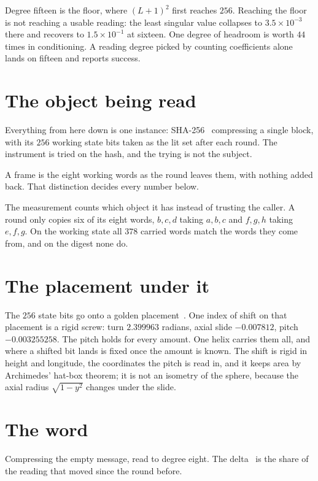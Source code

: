 Degree fifteen is the floor, where \((L+1)^2\) first reaches \(256\). Reaching the floor is not reaching a usable reading: the least singular value collapses to \(3.5 \times 10^{-3}\) there and recovers to \(1.5 \times 10^{-1}\) at sixteen. One degree of headroom is worth \(44\) times in conditioning. A reading degree picked by counting coefficients alone lands on fifteen and reports success.

\section{The object being read}

Everything from here down is one instance: SHA-256~\cite{src:FIPS-180-4} compressing a single block, with its \(256\) working state bits taken as the lit set after each round. The instrument is tried on the hash, and the trying is not the subject.

A frame is the eight working words as the round leaves them, with nothing added back. That distinction decides every number below.

The measurement counts which object it has instead of trusting the caller. A round only copies six of its eight words, \(b,c,d\) taking \(a,b,c\) and \(f,g,h\) taking \(e,f,g\). On the working state all \(378\) carried words match the words they come from, and on the digest none do.

\section{The placement under it}

The \(256\) state bits go onto a golden placement~\cite{src:Vogel-1979,src:Swinbank-and-Purser-2006}. One index of shift on that placement is a rigid screw: turn \(2.399963\) radians, axial slide \(-0.007812\), pitch \(-0.003255258\). The pitch holds for every amount. One helix carries them all, and where a shifted bit lands is fixed once the amount is known. The shift is rigid in height and longitude, the coordinates the pitch is read in, and it keeps area by Archimedes' hat-box theorem; it is not an isometry of the sphere, because the axial radius \(\sqrt{1 - y^2}\) changes under the slide.

\section{The word}

Compressing the empty message, read to degree eight. The delta~\cite{src:Levin-Peres-and-Wilmer-2009} is the share of the reading that moved since the round before.

